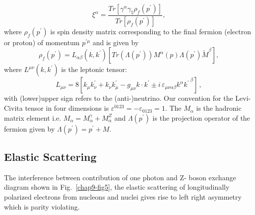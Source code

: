 \begin{equation}
\xi^\alpha =\frac{Tr[\gamma^\alpha \gamma_5\rho_f(p^\prime)]}{Tr[ \rho_f(p^\prime)] } , \label{chap9-eq14}
\end{equation}
where $\rho_f(p^\prime)$ is spin density matrix  corresponding to the final fermion (electron or proton) of momentum $p^{\prime\mu}$ and is given by 
\begin{equation}
\rho_f(p^\prime)= L_{ \alpha \beta}(k,k^\prime)[Tr(\Lambda(p^\prime) )M^\alpha(p)\Lambda(p^\prime)\tilde{M}^\beta] , \label{chap9-eq15}
\end{equation}
where $L^{\mu \nu}(k,k^\prime)$ is the leptonic tensor: 
\begin{equation}
    L_{\mu \nu}= 8 \left[  k_\mu  k^\prime_\nu  +  k_\nu  k^\prime_\mu  - g_{\mu \nu} k \cdot k^\prime 
    \pm  i \, \varepsilon_{\mu \nu \alpha \beta} k^\alpha {k^\prime \,}^\beta \right] \, , \label{chap9-eq16}
\end{equation}
with (lower)upper sign refers to the (anti-)neutrino. Our convention for the Levi-Civita tensor in four dimensions is 
$\varepsilon^{0123}=-\varepsilon_{0123}=1$. The $M_\alpha$ is the hadronic matrix element i.e. $M_\alpha=M_\alpha^\gamma+ M_\alpha^Z$ and $\Lambda(p^\prime)$ is the projection operator of the fermion given by $\Lambda(p^\prime)={p^{\prime}}+M$.

\subsection{Elastic Scattering}\label{chap9-subsec3.1}

The interference between contribution of one photon and Z- boson  exchange diagram shown in Fig.~\ref{chap9-fig5}, the elastic scattering of longitudinally polarized electrons from nucleons and nuclei gives rise to left right asymmetry which is parity violating. 


